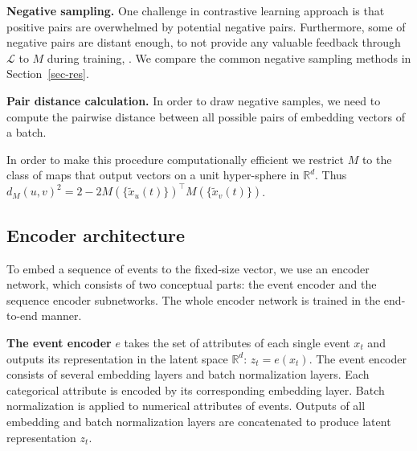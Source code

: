 \documentclass[sigconf, anonymous]{acmart}
\newcommand{\R}{\mathbb{R}}
\begin{document}

\textbf{Negative sampling.} One challenge in contrastive learning approach is that positive pairs
are overwhelmed by potential negative pairs. Furthermore, some of negative pairs are distant enough,
to not provide any valuable feedback through $\mathcal{L}$ to $M$ during training, \citep{SimoSerra2015DiscriminativeLO,Schroff2015FaceNetAU}. We compare the common negative sampling
methods in Section~\ref{sec-res}.

\textbf{Pair distance calculation.}
In order to draw negative samples, we need to compute the pairwise distance between all possible
pairs of embedding vectors of a batch.

In order to make this procedure computationally efficient we restrict $M$ to the class of maps that
output vectors on a unit hyper-sphere in $\R^d$. Thus $
    d_M(u, v)^2 = 2 - 2 M(\{\tilde{x}_u(t)\})^\top M(\{\tilde{x}_v(t)\})
$.

\subsection{Encoder architecture} \label{sec-enc-arch}

To embed a sequence of events to the fixed-size vector, we use an encoder network, which consists of two conceptual parts: the event encoder and the sequence encoder subnetworks. The whole encoder network is trained in the end-to-end manner.

\textbf{The event encoder} $e$ takes the set of attributes of each single event $x_t$ and outputs its representation in the latent space $\R^d$: $z_t = e(x_t)$. The event encoder consists of several embedding layers and batch normalization layers. Each categorical attribute is encoded by its corresponding embedding layer. Batch normalization is applied to numerical attributes of events. Outputs of all embedding and batch normalization layers are concatenated to produce latent representation $z_t$.
\end{document}
